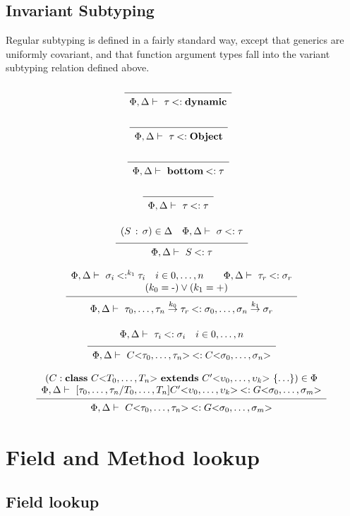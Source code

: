 \documentclass[fleqn, draft]{article}
\makeatletter
\newcommand{\Arrow}[3][-]{#2 \overset{#1}{\rightarrow} #3}
\newcommand{\Bottom}{\mathbf{bottom}}
\newcommand{\Dynamic}{\mathbf{dynamic}}
\newcommand{\Object}{\mathbf{Object}}
\newcommand{\TApp}[2]{#1\mathrm{<}#2\mathrm{>}}
\newcommand{\kwclass}{\kw{class}}
\newcommand{\kwextends}{\kw{extends}}
\newcommand{\dclass}[3]{\kwclass\ #1\ \kwextends\ #2\ \{#3\}}
\newcommand{\sub}{\mathbin{<:}}
\newcommand{\infrulem}[3][]{
  \begin{array}{c@{\ }c}
    \begin{array}{cccc}
      #2 \vspace{-2mm} 
    \end{array} \\
    \hrulefill & #1 \\
    \begin{array}{l}
      #3
    \end{array}
  \end{array}
  }
\newcommand{\axiomm}[2][]{
  \begin{array}{cc}
    \hrulefill & #1 \\
    \begin{array}{c}
      #2
    \end{array}
  \end{array}
  }
\newcommand{\infrule}[3][]{
  \[ 
  \infrulem[#1]{#2}{#3}
  \]
  }
\newcommand{\axiom}[2][]{
  \[ 
  \axiomm[#1]{#2}
  \]
  }
\newcommand{\subst}[2]{[#1/#2]}
\newcommand{\subtypeOf}[4][]{#2 \vdash\ #3 \sub^{#1} #4}
\makeatother
\begin{document}
\subsection*{Invariant Subtyping}

Regular subtyping is defined in a fairly standard way, except that generics are
uniformly covariant, and that function argument types fall into the variant
subtyping relation defined above.

\axiom{\subtypeOf{\Phi, \Delta}{\tau}{\Dynamic}}

\axiom{\subtypeOf{\Phi, \Delta}{\tau}{\Object}} 

\axiom{\subtypeOf{\Phi, \Delta}{\Bottom}{\tau}}

\axiom{\subtypeOf{\Phi, \Delta}{\tau}{\tau}} 

\infrule{(S\, :\, \sigma) \in \Delta \quad
         \subtypeOf{\Phi, \Delta}{\sigma}{\tau}}
        {\subtypeOf{\Phi, \Delta}{S}{\tau}} 

\infrule{\subtypeOf[k_1]{\Phi, \Delta}{\sigma_i}{\tau_i} \quad i \in 0, \ldots, n \quad\quad
         \subtypeOf{\Phi, \Delta}{\tau_r}{\sigma_r} \\
         \quad (k_0 = \mbox{-}) \lor (k_1 = \mbox{+})
        } 
        {\subtypeOf{\Phi, \Delta}
                   {\Arrow[k_0]{\tau_0, \ldots, \tau_n}{\tau_r}}
                   {\Arrow[k_1]{\sigma_0, \ldots, \sigma_n}{\sigma_r}}} 

\infrule{\subtypeOf{\Phi, \Delta}{\tau_i}{\sigma_i} & i \in 0, \ldots, n}
        {\subtypeOf{\Phi, \Delta}
          {\TApp{C}{\tau_0, \ldots, \tau_n}}
          {\TApp{C}{\sigma_0, \ldots, \sigma_n}}}

\infrule{(C : \dclass{\TApp{C}{T_0,\ldots,T_n}}{\TApp{C'}{\upsilon_0, \ldots, \upsilon_k}}{\ldots}) \in \Phi \\
         \subtypeOf{\Phi, \Delta}{\subst{\tau_0, \ldots, \tau_n}{T_0, \ldots, T_n}{\TApp{C'}{\upsilon_0, \ldots, \upsilon_k}}}{\TApp{G}{\sigma_0, \ldots, \sigma_m}}}
        {\subtypeOf{\Phi, \Delta}
          {\TApp{C}{\tau_0, \ldots, \tau_n}}
          {\TApp{G}{\sigma_0, \ldots, \sigma_m}}}

\section*{Field and Method lookup}

\subsection*{Field lookup}
\end{document}
